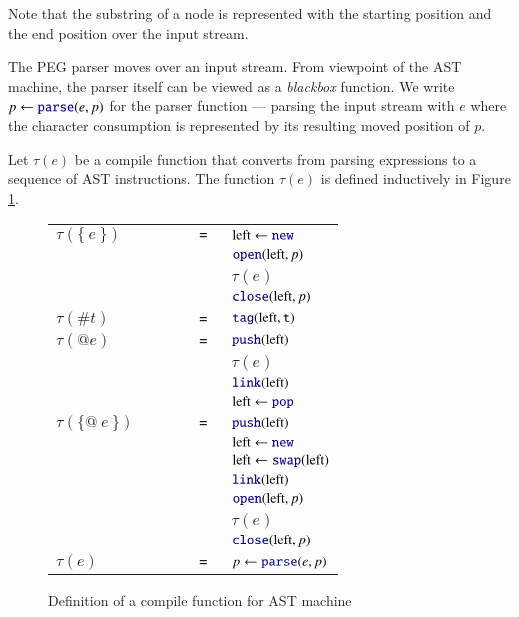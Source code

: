 \documentclass[JIP]{ipsj}
\begin{document}
Note that the substring of a node is represented with the starting position and the end position over the input stream. 

The PEG parser moves over an input stream. From viewpoint of the AST machine, the parser itself can be viewed as a {\em blackbox} function. We write $p \leftarrow \kw{parse}(e, p)$ for the parser function --- parsing the input stream with $e$ where the character consumption is represented by its resulting moved position of $p$.

Let $\tau(e)$ be a compile function that converts from parsing expressions to a sequence of AST instructions. The function $\tau(e)$ is defined inductively in Figure \ref{fig:tau}.

\begin{figure}[tb]

\begin{tabular}{lrl} 
$\tau(\{~e~\})$ &  \verb|      = | & $\textrm{left} \leftarrow \kw{new}$  \\ 
 &  & $\kw{open}(\textrm{left}, p)$  \\
 &  & $\tau(e)$  \\
 &  & $\kw{close}(\textrm{left}, p)$  \\
$\tau(\#t)$ &  \verb|      = | & $\kw{tag}(\textrm{left}, {\tt t})$  \\ 
$\tau(@e)$ &  \verb|      = | & $\kw{push}(\textrm{left})$  \\ 
 &  & $\tau(e)$  \\
 &  & $\kw{link}(\textrm{left})$  \\
 &  & $\textrm{left} \leftarrow \kw{pop}$  \\
$\tau(\{@ ~e ~\})$ &  \verb|      = | & $\kw{push}(\textrm{left})$  \\ 
 &  & $\textrm{left} \leftarrow \kw{new}$  \\ 
 &  & $\textrm{left} \leftarrow \kw{swap}(\textrm{left})$  \\ 
 &  & $\kw{link}(\textrm{left})$  \\ 
 &  & $\kw{open}(\textrm{left}, p)$  \\
 &  & $\tau(e)$  \\
 &  & $\kw{close}(\textrm{left}, p)$  \\
$\tau(e)$ &  \verb|      = | & $p \leftarrow \kw{parse}(e, p)$  \\ 
\end{tabular} 
\caption{Definition of a compile function for AST machine}
\label{fig:tau}

\end{figure}
\end{document}
